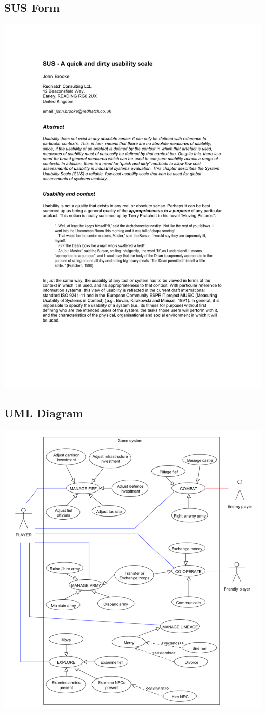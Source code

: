\documentclass{article}
\begin{document}
	\subsection{SUS Form}
	\centering
	\includegraphics[page=6]{sus.pdf} 
	\subsection{UML Diagram}
	\centering
	\includegraphics[width=\textwidth]{gameUML}
\end{document}
